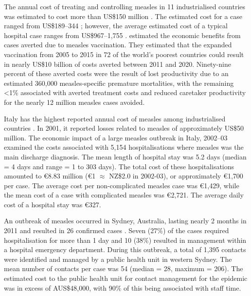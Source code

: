 \documentclass{article}
\begin{document}
The annual cost of treating and controlling measles in 11 industrialised countries was estimated to cost more than US\$150 million \citep{carabin3}. The estimated cost for a case ranged from US\$189--344 \citep{carabin3}; however, the average estimated cost of a typical hospital case ranges from US\$967--1,755 \citep{carabin2}. \citep{stack11} estimated the economic benefits from cases averted due to measles vaccination. They estimated that the expanded vaccination from 2005 to 2015 in 72 of the world's poorest countries could result in nearly US\$10 billion of costs averted between 2011 and 2020. Ninety-nine percent of these averted costs were the result of lost productivity due to an estimated 360,000 measles-specific premature mortalities, with the remaining <1\% associated with averted treatment costs and reduced caretaker productivity for the nearly 12 million measles cases avoided.


Italy has the highest reported annual cost of measles among industrialised countries \citep{carabin3}. In 2001, it reported losses related to measles of approximately US\$50 million. The economic impact of a large measles outbreak in Italy, 2002--03 examined the costs associated with 5,154 hospitalisations where measles was the main discharge diagnosis. The mean length of hospital stay was 5.2 days (median = 4 days and range = 1 to 303 days). The total cost of these hospitalisations amounted to \euro 8.83 million (\euro 1 $\approx$ NZ\$2.0 in 2002-03), or approximately \euro 1,700 per case. The average cost per non-complicated measles case was  \euro 1,429, while the mean cost of a case with complicated measles was  \euro 2,721. The average daily cost of a hospital stay was  \euro 327.

An outbreak of measles occurred in Sydney, Australia, lasting nearly 2 months in 2011 and resulted in 26 confirmed cases \citep{flego13}. Seven (27\%) of the cases required hospitalisation for more than 1 day and 10 (38\%) resulted in management within a hospital emergency department. During this outbreak, a total of 1,395 contacts were identified and managed by a public health unit in western Sydney. The mean number of contacts per case was 54 (median = 28, maximum = 206). The estimated cost to the public health unit for contact management for the epidemic was in excess of AUS\$48,000, with 90\% of this being associated with staff time. 
\end{document}
